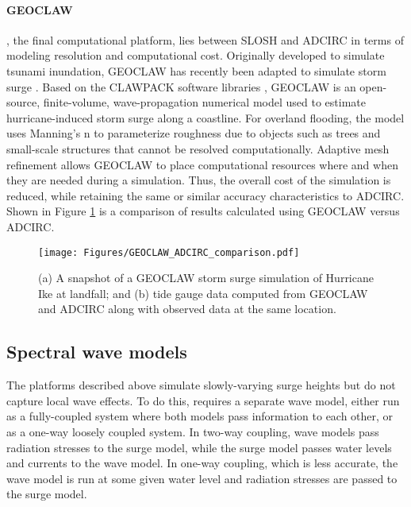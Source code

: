 \paragraph{GEOCLAW} , the final computational platform, lies between SLOSH and ADCIRC in terms of modeling resolution and computational cost. Originally developed to simulate tsunami inundation, GEOCLAW has recently been adapted to simulate storm surge \citep{berger2011geoclaw, Mandli et al. 2014}. Based on the CLAWPACK software libraries \citep{leveque2002finite}, GEOCLAW is an open-source, finite-volume, wave-propagation numerical model used to estimate hurricane-induced storm surge along a coastline. For overland flooding, the model uses Manning's n to parameterize roughness due to objects such as trees and small-scale structures that cannot be resolved computationally. Adaptive mesh refinement allows GEOCLAW to place computational resources where and when they are needed during a simulation. Thus, the overall cost of the simulation is reduced, while retaining the same or similar accuracy characteristics to ADCIRC. Shown in Figure \ref{fig:GEOCLAW_ADCIRC_comparison} is a comparison of results calculated using GEOCLAW versus ADCIRC. 

\begin{figure}[htb]
    \centering
    \texttt{[image: Figures/GEOCLAW\_ADCIRC\_comparison.pdf]}
    \caption{(a) A snapshot of a GEOCLAW storm surge simulation of Hurricane Ike at landfall; and (b) tide gauge data computed from GEOCLAW and ADCIRC along with observed data at the same location. \citep{mandli2016clawpack}}
    \label{fig:GEOCLAW_ADCIRC_comparison}
\end{figure}

\subsection{Spectral wave models}

The platforms described above simulate slowly-varying surge heights but do not capture local wave effects. To do this, requires a separate wave model, either run as a fully-coupled system where both models pass information to each other, or as a one-way loosely coupled system. In two-way coupling, wave models pass radiation stresses to the surge model, while the surge model passes water levels and currents to the wave model. In one-way coupling, which is less accurate, the wave model is run at some given water level and radiation stresses are passed to the surge model.

